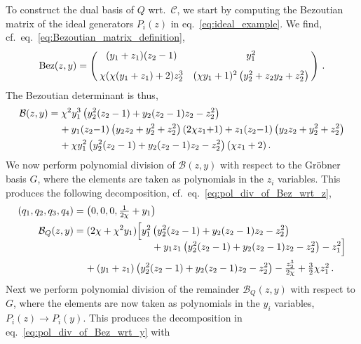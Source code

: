 \documentclass[dvipsnames,preprint,12pt,sort&compress]{elsarticle}
\begin{document}
To construct the dual basis of $Q$ wrt.~$\mathcal{C}$, we start by
computing the Bezoutian matrix of the ideal generators $P_i(z)$ in eq.~\eqref{eq:ideal_example}.
We find, cf.~eq.~\eqref{eq:Bezoutian_matrix_definition},
\begin{equation}
\mathrm{Bez} (z,y)
=\left( \hspace{-1mm}
\begin{array}{cc}
 (y_1+z_1) (z_2-1)                & y_1^2 \\[3mm]
 \chi  (\chi  (y_1+z_1)+2) z_2^3  & (\chi  y_1+1)^2 \left(y_2^2+z_2 y_2+z_2^2\right)
\end{array} \hspace{-1mm}
\right) \,.
\end{equation}
The Bezoutian determinant is thus,
\begin{align}
\mathcal{B}(z,y) &=
\chi^2 y_1^3 \left(y_2^2 (z_2-1)+y_2 (z_2-1) z_2-z_2^2\right) \nonumber \\
&\hspace{4mm} +y_1 (z_2{-}1) \left(y_2 z_2+y_2^2+z_2^2\right) (2 \chi z_1{+}1)+z_1 (z_2{-}1) \left(y_2 z_2+y_2^2+z_2^2\right)  \nonumber \\
&\hspace{4mm} +\chi y_1^2 \left(y_2^2 (z_2-1)+y_2 (z_2-1) z_2-z_2^2\right) (\chi z_1+2) \,.
\end{align}
We now perform polynomial division of $\mathcal{B}(z,y)$ with respect
to the Gr{\"o}bner basis $G$, where the elements are taken as
polynomials in the $z_i$ variables. This produces the following
decomposition, cf.~eq.~\eqref{eq:pol_div_of_Bez_wrt_z},
\begin{align}
(q_1, q_2, q_3, q_4) &= \big( 0,0,0, \textstyle{\frac{1}{2\chi}} + y_1 \big) \\
\mathcal{B}_Q(z,y) &= (2 \chi +\chi^2 y_1) \Big[y_1^2 \left(y_2^2 (z_2-1)+y_2 (z_2-1) z_2-z_2^2\right) \nonumber \\[-2mm]
& \hspace{28mm} +y_1 z_1 \left(y_2^2 (z_2-1)+y_2 (z_2-1) z_2-z_2^2\right)-z_1^2\Big] \nonumber \\
& \hspace{4mm} +(y_1+z_1) \left(y_2^2 (z_2-1)+y_2 (z_2-1) z_2-z_2^2\right)-\textstyle{\frac{z_2^3}{2 \chi}}
+\textstyle{\frac{3}{2}} \chi z_1^2 \,.
\end{align}
Next we perform polynomial division of the remainder $\mathcal{B}_Q(z,y)$ with respect to $G$,
where the elements are now taken as polynomials in the $y_i$ variables,
$P_i(z) \to P_i(y)$. This produces the decomposition in eq.~\eqref{eq:pol_div_of_Bez_wrt_y} with
\end{document}
